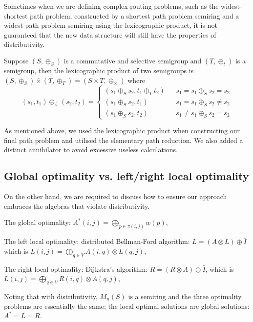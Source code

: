 \documentclass[a4paper,12pt,twoside,openright]{report}
\begin{document}
Sometimes when we are defining complex routing problems, such as the widest-shortest path problem, constructed by a shortest path problem semiring and a widest path problem semiring using the lexicographic product, it is not guaranteed that the new data structure will still have the properties of distributivity. 

Suppose $(S,\oplus_S)$ is a commutative and selective semigroup and $(T,\oplus_t)$ is a semigroup, then the lexicographic product of two semigroups is $(S,\oplus_S) \bar{\times} (T,\oplus_T) = (S\times T, \oplus_{\bar{\times}})$ where
\[(s_1,t_1) \oplus_{\bar{\times}} (s_2,t_2)=\left\{
\begin{array}{rcl}
(s_1\oplus_S s_2,t_1\oplus_T t_2)      &      & { s_1 = s_1 \oplus_S s_2 = s_2}\\
(s_1\oplus_S s_2,t_1)       &      & {s_1 = s_1 \oplus_S s_2 \neq s_2}\\
(s_1\oplus_S s_2,t_2)       &      & {s_1 \neq s_1 \oplus_S s_2 = s_2}
\end{array} \right.\]

As mentioned above, we used the lexicographic product when constructing our final path problem and utilised the elementary path reduction. We also added a distinct annihilator to avoid excessive useless calculations. 


\subsection{Global optimality vs. left/right local optimality}
On the other hand, we are required to discuss how to ensure our approach embraces the algebras that violate distributivity.

The global optimality: $A^*(i,j) = \bigoplus_{p \in \pi (i,j)}w(p)$,

The left local optimality: distributed Bellman-Ford algorithm: $L = (A\otimes L) \oplus \bar{I}$ which is $L(i,j) = \bigoplus_{q \in V} A(i,q)\otimes L(q,j)$,

The right local optimality: Dijkstra's algorithm: $R = (R\otimes A) \oplus \bar{I}$, which is  $L(i,j) = \bigoplus_{q \in V} R(i,q)\otimes A(q,j)$,

Noting that with distributivity, $M_n(S)$ is a semiring and the three optimality problems are essentially the same; the local optimal solutions are global solutions: $A^* = L = R$.
\end{document}
